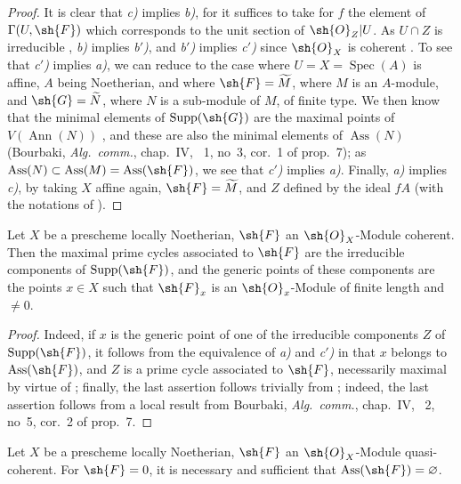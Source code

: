 \begin{proof}
It is clear that \emph{c)} implies \emph{b)}, for it suffices to take for $f$ the element of $\Gamma(U,\sh{F})$ which corresponds to the unit section of $\sh{O}_Z|U$.
As $U\cap Z$ is irreducible , \emph{b)} implies \emph{b$'$)}, and \emph{b$'$)} implies \emph{c$'$)} since $\sh{O}_X$ is coherent .
To see that \emph{c$'$)} implies \emph{a)}, we can reduce to the case where $U=X=\operatorname{Spec}(A)$ is affine, $A$ being Noetherian, and where $\sh{F}=\widetilde{M}$, where $M$ is an $A$-module, and $\sh{G}=\widetilde{N}$, where $N$ is a sub-module of $M$, of finite type.
We then know that the minimal elements of $\operatorname{Supp}(\sh{G})$ are the maximal points of $V(\operatorname{Ann}(N))$ , and these are also the minimal elements of $\operatorname{Ass}(N)$ (Bourbaki, \emph{Alg.\ comm.}, chap.~IV, \textsection~1, no~3, cor.~1 of prop.~7);
as $\operatorname{Ass}(N)\subset\operatorname{Ass}(M)=\operatorname{Ass}(\sh{F})$, we see that \emph{c$'$)} implies \emph{a)}.
Finally, \emph{a)} implies \emph{c)}, by taking $X$ affine again, $\sh{F}=\widetilde{M}$, and $Z$ defined by the ideal $fA$ (with the notations of ).
\end{proof}

\begin{corollary}[3.1.4]
\label{IV.3.1.4}
Let $X$ be a prescheme locally Noetherian, $\sh{F}$ an $\sh{O}_X$-Module coherent.
Then the maximal prime cycles associated to $\sh{F}$ are the irreducible components of $\operatorname{Supp}(\sh{F})$, and the generic points of these components are the points $x\in X$ such that $\sh{F}_x$ is an $\sh{O}_x$-Module of finite length and $\neq 0$.
\end{corollary}

\begin{proof}
Indeed, if $x$ is the generic point of one of the irreducible components $Z$ of $\operatorname{Supp}(\sh{F})$, it follows from the equivalence of \emph{a)} and \emph{c$'$)} in  that $x$ belongs to $\operatorname{Ass}(\sh{F})$, and $Z$ is a prime cycle associated to $\sh{F}$, necessarily maximal by virtue of ; finally, the last assertion follows trivially from ; indeed, the last assertion follows from a local result from Bourbaki, \emph{Alg.\ comm.}, chap.~IV, \textsection~2, no~5, cor.~2 of prop.~7.
\end{proof}

\begin{corollary}[3.1.5]
\label{IV.3.1.5}
Let $X$ be a prescheme locally Noetherian, $\sh{F}$ an $\sh{O}_X$-Module quasi-coherent.
For $\sh{F}=0$, it is necessary and sufficient that $\operatorname{Ass}(\sh{F})=\varnothing$.
\end{corollary}


